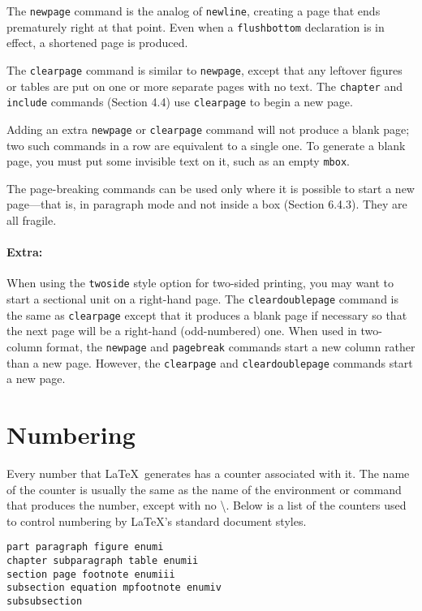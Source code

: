 \documentclass{article}
\begin{document}
The \verb:newpage: command is the analog of \verb:newline:, creating a page that ends prematurely
right at that point. Even when a \verb:flushbottom: declaration is in effect, a shortened page is
produced.

The \verb:clearpage: command is similar to \verb:newpage:, except that any leftover figures or
tables are put on one or more separate pages with no text. The \verb:chapter: and \verb:include:
commands (Section 4.4) use \verb:clearpage: to begin a new page.

Adding an extra \verb:newpage: or \verb:clearpage: command will not produce a blank page; two such
commands in a row are equivalent to a single one. To generate a blank page, you must put some
invisible text on it, such as an empty \verb:mbox:.

The page-breaking commands can be used only where it is possible to start a new page---that is, in
paragraph mode and not inside a box (Section 6.4.3). They are all fragile.

\paragraph{Extra:} When using the {\tt twoside} style option for two-sided printing, you may want to
 start a sectional unit on a right-hand page. 
 The \verb:cleardoublepage: command is the same as \verb:clearpage: except that it produces a blank 
 page if necessary so that the next page will be a right-hand (odd-numbered) one. 
 When used in two-column format, the \verb:newpage: and \verb:pagebreak: commands start a new column 
 rather than a new page. 
 However, the \verb:clearpage: and \verb:cleardoublepage: commands start a new page.


\section{Numbering}

Every number that \LaTeX\ generates has a counter associated with it. The name of the counter is
usually the same as the name of the environment or command that produces the number, except with
no \textbackslash. Below is a list of the counters used to control numbering by \LaTeX's standard
document styles.

\begin{verbatim}
part paragraph figure enumi
chapter subparagraph table enumii
section page footnote enumiii
subsection equation mpfootnote enumiv
subsubsection
\end{verbatim}
\end{document}
